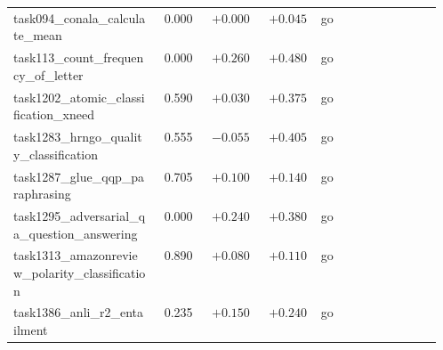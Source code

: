 \begin{longtable}{@{}p{0.34\linewidth}rrrcp{0.22\linewidth}@{}}
\scriptsize task094\_\hspace{0pt}conala\_\hspace{0pt}calculate\_\hspace{0pt}mean & \scriptsize 0.000 & \scriptsize $+0.000$ & \scriptsize $+0.045$ & \scriptsize go & \scriptsize  \\
\scriptsize task113\_\hspace{0pt}count\_\hspace{0pt}frequency\_\hspace{0pt}of\_\hspace{0pt}letter & \scriptsize 0.000 & \scriptsize $+0.260$ & \scriptsize $+0.480$ & \scriptsize go & \scriptsize  \\
\scriptsize task1202\_\hspace{0pt}atomic\_\hspace{0pt}classification\_\hspace{0pt}xneed & \scriptsize 0.590 & \scriptsize $+0.030$ & \scriptsize $+0.375$ & \scriptsize go & \scriptsize  \\
\scriptsize task1283\_\hspace{0pt}hrngo\_\hspace{0pt}quality\_\hspace{0pt}classification & \scriptsize 0.555 & \scriptsize $-0.055$ & \scriptsize $+0.405$ & \scriptsize go & \scriptsize  \\
\scriptsize task1287\_\hspace{0pt}glue\_\hspace{0pt}qqp\_\hspace{0pt}paraphrasing & \scriptsize 0.705 & \scriptsize $+0.100$ & \scriptsize $+0.140$ & \scriptsize go & \scriptsize  \\
\scriptsize task1295\_\hspace{0pt}adversarial\_\hspace{0pt}qa\_\hspace{0pt}question\_\hspace{0pt}answering & \scriptsize 0.000 & \scriptsize $+0.240$ & \scriptsize $+0.380$ & \scriptsize go & \scriptsize  \\
\scriptsize task1313\_\hspace{0pt}amazonreview\_\hspace{0pt}polarity\_\hspace{0pt}classification & \scriptsize 0.890 & \scriptsize $+0.080$ & \scriptsize $+0.110$ & \scriptsize go & \scriptsize  \\
\scriptsize task1386\_\hspace{0pt}anli\_\hspace{0pt}r2\_\hspace{0pt}entailment & \scriptsize 0.235 & \scriptsize $+0.150$ & \scriptsize $+0.240$ & \scriptsize go & \scriptsize  \\

\end{longtable}
